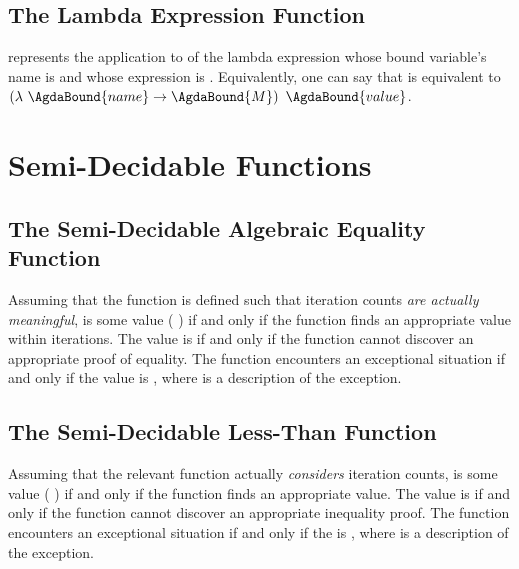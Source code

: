 \documentclass{report}
\begin{document}
\subsection{The Lambda Expression Function}
     represents the application to  of the lambda expression whose bound variable's name is  and whose expression is .  Equivalently, one can say that      is equivalent to \(\left(\lambda\ \AgdaBound{name} \rightarrow \AgdaBound{M}\right)\ \AgdaBound{value}\).

\section{Semi-Decidable Functions}

\subsection{The Semi-Decidable Algebraic Equality Function}
Assuming that the function is defined such that iteration counts \emph{are actually meaningful},      is some value  \AgdaSymbol( \AgdaSymbol) if and only if the  function finds an appropriate value within  iterations.  The  value is   if and only if the function cannot discover an appropriate proof of equality.  The function encounters an exceptional situation if and only if the  value is  , where  is a description of the exception.

\subsection{The Semi-Decidable Less-Than Function}
Assuming that the relevant function actually \emph{considers} iteration counts,      is some value  \AgdaSymbol( \AgdaSymbol) if and only if the  function finds an appropriate value.  The  value is   if and only if the function cannot discover an appropriate inequality proof.  The function encounters an exceptional situation if and only if the  is  , where  is a description of the exception.
\end{document}
